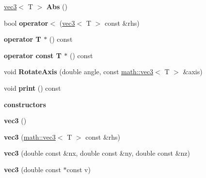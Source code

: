 \begin{DoxyCompactItemize}
\item 
\hypertarget{classmath_1_1vec3_aba9492a415256e0c647bcc719b914430}{
\hyperlink{classmath_1_1vec3}{vec3}$<$ T $>$ {\bfseries Abs} ()}
\label{classmath_1_1vec3_aba9492a415256e0c647bcc719b914430}

\item 
\hypertarget{classmath_1_1vec3_acb820fcead5ddafeb6dde5bc52807b06}{
bool {\bfseries operator$<$} (\hyperlink{classmath_1_1vec3}{vec3}$<$ T $>$ const \&rhs)}
\label{classmath_1_1vec3_acb820fcead5ddafeb6dde5bc52807b06}

\item 
\hypertarget{classmath_1_1vec3_a5e4169f776dad4d3f3364ba0289321cb}{
{\bfseries operator T $\ast$} () const }
\label{classmath_1_1vec3_a5e4169f776dad4d3f3364ba0289321cb}

\item 
\hypertarget{classmath_1_1vec3_af5a8cf41a9216e6f52e2f0a105f17ee2}{
{\bfseries operator const T $\ast$} () const }
\label{classmath_1_1vec3_af5a8cf41a9216e6f52e2f0a105f17ee2}

\item 
\hypertarget{classmath_1_1vec3_a6b660d27a7bf07fe8b5ac19f0fc8b908}{
void {\bfseries RotateAxis} (double angle, const \hyperlink{classmath_1_1vec3}{math::vec3}$<$ T $>$ \&axis)}
\label{classmath_1_1vec3_a6b660d27a7bf07fe8b5ac19f0fc8b908}

\item 
\hypertarget{classmath_1_1vec3_a587e1d4e4ba254d049db04e1afb8773f}{
void {\bfseries print} () const }
\label{classmath_1_1vec3_a587e1d4e4ba254d049db04e1afb8773f}

\end{DoxyCompactItemize}
\begin{Indent}{\bf constructors}\par
{\em \label{_amgrp0d8243d493859cb6cbec161117e79b0d}
 }\begin{DoxyCompactItemize}
\item 
\hypertarget{classmath_1_1vec3_a1c9db4362d233790c6d8f4a896b77a3f}{
{\bfseries vec3} ()}
\label{classmath_1_1vec3_a1c9db4362d233790c6d8f4a896b77a3f}

\item 
\hypertarget{classmath_1_1vec3_a6faf6197cea623fc525e7b45fe7a5708}{
{\bfseries vec3} (\hyperlink{classmath_1_1vec3}{math::vec3}$<$ T $>$ const \&rhs)}
\label{classmath_1_1vec3_a6faf6197cea623fc525e7b45fe7a5708}

\item 
\hypertarget{classmath_1_1vec3_a6a8c24654f1cd0904bec64f5a96b9649}{
{\bfseries vec3} (double const \&nx, double const \&ny, double const \&nz)}
\label{classmath_1_1vec3_a6a8c24654f1cd0904bec64f5a96b9649}

\item 
\hypertarget{classmath_1_1vec3_a0aa664d081e6235be5a4d70245023a75}{
{\bfseries vec3} (double const $\ast$const v)}
\label{classmath_1_1vec3_a0aa664d081e6235be5a4d70245023a75}

\end{DoxyCompactItemize}
\end{Indent}
